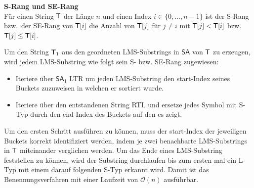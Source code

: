 \begin{definition}\textbf{S-Rang und SE-Rang}\\
Für einen String $\inputtext$ der Länge $n$ und einen Index $i \in \{0, \ldots, n-1\}$ ist der S-Rang bzw.\ der SE-Rang von $\inputtext[i]$ die Anzahl von $\inputtext[j]$ für $j \neq i$ mit $\inputtext[j] < \inputtext[i]$ bzw.\ $\inputtext[j] \leq \inputtext[i]$. 
\end{definition}

Um den String $\inputtext_1$ aus den geordneten LMS-Substrings in $\mathsf{SA}$ von $\inputtext$ zu erzeugen, wird jedem LMS-Substring wie folgt sein S- bzw. SE-Rang zugewiesen:

\begin{itemize}
\item Iteriere über $\mathsf{SA}_1$ LTR um jeden LMS-Substring den start-Index seines Buckets zuzuweisen in welchen er sortiert wurde.
\item Iteriere über den entstandenen String RTL und ersetze jedes Symbol mit S-Typ durch den end-Index des Buckets auf den es zeigt.
\end{itemize}

Um den ersten Schritt ausführen zu können, muss der start-Index der jeweiligen Buckets korrekt identifiziert werden, indem je zwei benachbarte LMS-Substrings in $\inputtext$ miteinander verglichen werden. Um das Ende eines LMS-Substring feststellen zu können, wird der Substring durchlaufen bis zum ersten mal ein L-Typ mit einem darauf folgenden S-Typ erkannt wird. Damit ist das Benennungsverfahren mit einer Laufzeit von $\mathcal O(n)$ ausführbar.
